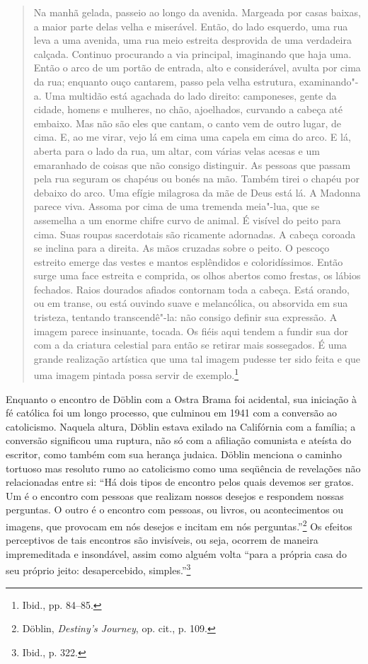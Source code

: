 \begin{quote}
Na manhã gelada, passeio ao longo da avenida. Margeada por casas baixas,
a maior parte delas velha e miserável. Então, do lado esquerdo, uma rua
leva a uma avenida, uma rua meio estreita desprovida de uma verdadeira
calçada. Continuo procurando a via principal, imaginando que haja uma.
Então o arco de um portão de entrada, alto e considerável, avulta por
cima da rua; enquanto ouço cantarem, passo pela velha estrutura,
examinando"-a. Uma multidão está agachada do lado direito: camponeses,
gente da cidade, homens e mulheres, no chão, ajoelhados, curvando a
cabeça até embaixo. Mas não são eles que cantam, o canto vem de outro
lugar, de cima. E, ao me virar, vejo lá em cima uma capela em cima do
arco. E lá, aberta para o lado da rua, um altar, com várias velas acesas
e um emaranhado de coisas que não consigo distinguir. As pessoas que
passam pela rua seguram os chapéus ou bonés na mão. Também tirei o
chapéu por debaixo do arco. Uma efígie milagrosa da mãe de Deus está lá.
A Madonna parece viva. Assoma por cima de uma tremenda meia"-lua, que se
assemelha a um enorme chifre curvo de animal. É visível do peito para
cima. Suas roupas sacerdotais são ricamente adornadas. A cabeça coroada
se inclina para a direita. As mãos cruzadas sobre o peito. O pescoço
estreito emerge das vestes e mantos esplêndidos e coloridíssimos. Então
surge uma face estreita e comprida, os olhos abertos como frestas, os
lábios fechados. Raios dourados afiados contornam toda a cabeça. Está
orando, ou em transe, ou está ouvindo suave e melancólica, ou absorvida
em sua tristeza, tentando transcendê"-la: não consigo definir sua
expressão. A imagem parece insinuante, tocada. Os fiéis aqui tendem a
fundir sua dor com a da criatura celestial para então se retirar mais
sossegados. É uma grande realização artística que uma tal imagem pudesse
ter sido feita e que uma imagem pintada possa servir de
exemplo.\footnote{Ibid., pp. 84--85.}
\end{quote}

Enquanto o encontro de Döblin com a Ostra Brama foi acidental, sua
iniciação à fé católica foi um longo processo, que culminou em 1941 com
a conversão ao catolicismo. Naquela altura, Döblin estava exilado na
Califórnia com a família; a conversão significou uma ruptura, não só com
a afiliação comunista e ateísta do escritor, como também com sua herança
judaica. Döblin menciona o caminho tortuoso mas resoluto rumo ao
catolicismo como uma seqüência de revelações não relacionadas entre si:
``Há dois tipos de encontro pelos quais devemos ser gratos. Um é o
encontro com pessoas que realizam nossos desejos e respondem nossas
perguntas. O outro é o encontro com pessoas, ou livros, ou
acontecimentos ou imagens, que provocam em nós desejos e incitam em nós
perguntas.''\footnote{Döblin, \emph{Destiny's Journey}, op. cit., p.
  109.} Os efeitos perceptivos de tais encontros são invisíveis, ou
seja, ocorrem de maneira impremeditada e insondável, assim como alguém
volta ``para a própria casa do seu próprio jeito: desapercebido,
simples.''\footnote{Ibid., p. 322.}

